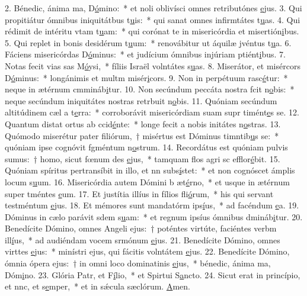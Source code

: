 2. Bénedic, ánima ma, D\uline{ó}mino:~* et noli oblivísci omnes retributónes \uline{e}jus.
3. Qui propitiátur ómnibus iniquitátbus t\uline{u}is:~* qui sanat omnes infirmtátes t\uline{u}as.
4. Qui rédimit de intéritu vtam t\uline{u}am:~* qui corónat te in misericórdia et misertión\uline{i}bus.
5. Qui replet in bonis desidérum t\uline{u}um:~* renovábitur ut áquilæ jvéntus t\uline{u}a.
6. Fáciens misericórdas D\uline{ó}minus:~* et judícium ómnibus injúriam ptiént\uline{i}bus.
7. Notas fecit vias sas M\uline{ó}ysi,~* fíliis Israël volntátes s\uline{u}as.
8. Miserátor, et misércors D\uline{ó}minus:~* longánimis et multm misér\uline{i}cors.
9. Non in perpétuum rasc\uline{é}tur:~* neque in ætérnum cmmináb\uline{i}tur.
10. Non secúndum peccáta nostra fcit n\uline{o}bis:~* neque secúndum iniquitátes nostras retrbuit n\uline{o}bis.
11. Quóniam secúndum altitúdinem cæl a t\uline{e}rra:~* corroborávit misericórdiam suam supr timént\uline{e}s se.
12. Quantum distat ortus ab ccid\uline{é}nte:~* longe fecit a nobis initátes n\uline{o}stras.
13. Quómodo miserétur pater filiórum,~† misértus est Dóminus timntib\uline{u}s se:~* quóniam ipse cognóvit fgméntum n\uline{o}strum.
14. Recordátus est quóniam pulvis sumus:~† homo, sicut fœnum des \uline{e}jus,~* tamquam flos agri sc efflor\uline{é}bit.
15. Quóniam spíritus pertransíbit in illo, et nn subs\uline{í}stet:~* et non cognóscet ámplis locum s\uline{u}um.
16. Misericórdia autem Dómini b æt\uline{é}rno,~* et usque in ætérnum super tméntes \uline{e}um.
17. Et justítia illíus in fílios fli\uline{ó}rum,~* his qui servant testméntum \uline{e}jus.
18. Et mémores sunt mandatórm ips\uline{í}us,~* ad facéndum \uline{e}a.
19. Dóminus in cælo parávit sdem s\uline{u}am:~* et regnum ipsíus ómnibus dmináb\uline{i}tur.
20. Benedícite Dómino, omnes Angeli ejus:~† poténtes virtúte, faciéntes verbm ill\uline{í}us,~* ad audiéndam vocem srmónum \uline{e}jus.
21. Benedícite Dómino, omnes virttes \uline{e}jus:~* minístri ejus, qui fácitis volntátem \uline{e}jus.
22. Benedícite Dómino, ómnia ópera ejus:~† in omni loco dominatinis \uline{e}jus,~* bénedic, ánima ma, Dóm\uline{i}no.
23. Glória Patr, et F\uline{í}lio,~* et Spirtui S\uline{a}ncto.
24. Sicut erat in princípio, et nnc, et s\uline{e}mper,~* et in sǽcula sæclórum. \uline{A}men.
